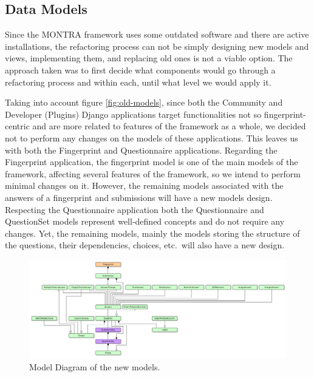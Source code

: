 \subsection{Data Models}

Since the MONTRA framework uses some outdated software and there are active installations, the refactoring process can not be simply designing new models and views, implementing them, and replacing old ones is not a viable option.
The approach taken was to first decide what components would go through a refactoring process and within each, until what level we would apply it.

Taking into account figure \ref{fig:old-models}, since both the Community and Developer (Plugins) Django applications target functionalities not so fingerprint-centric and are more related to features of the framework as a whole, we decided not to perform any changes on the models of these applications.
This leaves us with both the Fingerprint and Questionnaire applications.
Regarding the Fingerprint application, the fingerprint model is one of the main models of the framework, affecting several features of the framework, so we intend to perform minimal changes on it.
However, the remaining models associated with the answers of a fingerprint and submissions will have a new models design.
Respecting the Questionnaire application both the Questionnaire and QuestionSet models represent well-defined concepts and do not require any changes.
Yet, the remaining models, mainly the models storing the structure of the questions, their dependencies, choices, etc.\, will also have a new design.

\begin{figure}
    \center
    \includegraphics[width=\textwidth]{new-models}
    \caption{Model Diagram of the new models.}
    \label{fig:new-models}
\end{figure}

